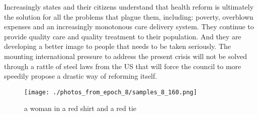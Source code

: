 \documentclass{article}%
\begin{document}
Increasingly states and their citizens understand that health reform is ultimately the solution for all the problems that plague them, including: poverty, overblown expenses and an increasingly monotonous care delivery system. They continue to provide quality care and quality treatment to their population. And they are developing a better image to people that needs to be taken seriously.\newline%
The mounting international pressure to address the present crisis will not be solved through a rattle of steel laws from the US that will force the council to more speedily propose a drastic way of reforming itself.\newline%

%


\begin{figure}[h!]%
\centering%
\texttt{[image: ./photos\_from\_epoch\_8/samples\_8\_160.png]}%
\caption{a woman in a red shirt and a red tie}%
\end{figure}

%
\end{document}
